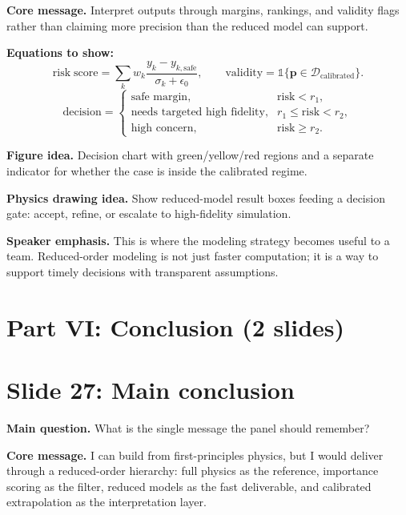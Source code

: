 \documentclass[11pt]{article}
\begin{document}
\textbf{Core message.} Interpret outputs through margins, rankings, and validity flags rather than claiming more precision than the reduced model can support.

\textbf{Equations to show:}
\begin{equation*}
\mathrm{risk\;score}=\sum_k w_k\frac{y_k-y_{k,\mathrm{safe}}}{\sigma_k+\epsilon_0},
\qquad
\mathrm{validity}=\mathbb{1}\{\mathbf{p}\in\mathcal{D}_{\mathrm{calibrated}}\}.
\end{equation*}
\begin{equation*}
\text{decision}=
\begin{cases}
\text{safe margin}, & \mathrm{risk}<r_1,\\
\text{needs targeted high fidelity}, & r_1\leq \mathrm{risk}<r_2,\\
\text{high concern}, & \mathrm{risk}\geq r_2.
\end{cases}
\end{equation*}

\textbf{Figure idea.} Decision chart with green/yellow/red regions and a separate indicator for whether the case is inside the calibrated regime.

\textbf{Physics drawing idea.} Show reduced-model result boxes feeding a decision gate: accept, refine, or escalate to high-fidelity simulation.

\textbf{Speaker emphasis.} This is where the modeling strategy becomes useful to a team. Reduced-order modeling is not just faster computation; it is a way to support timely decisions with transparent assumptions.

\section{Part VI: Conclusion (2 slides)}

\section{Slide 27: Main conclusion}
\begin{physicsbox}
\textbf{Main question.} What is the single message the panel should remember?
\end{physicsbox}

\textbf{Core message.} I can build from first-principles physics, but I would deliver through a reduced-order hierarchy: full physics as the reference, importance scoring as the filter, reduced models as the fast deliverable, and calibrated extrapolation as the interpretation layer.
\end{document}
